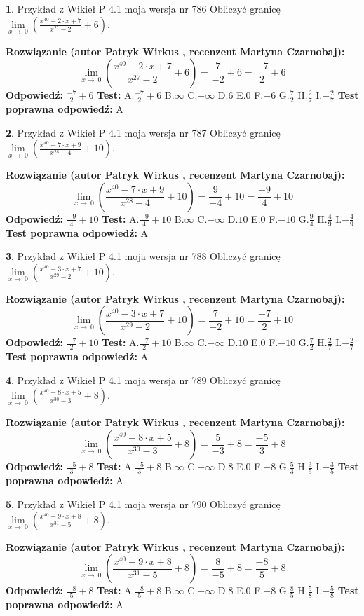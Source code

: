 \documentclass[12pt, a4paper]{article}
\theoremstyle{definition} %
\newtheorem{zad}{}
\newcommand{\zadStart}[1]{\begin{zad}#1\newline}
\newcommand{\zadStop}{\end{zad}}
\newcommand{\rozwStart}[2]{\noindent \textbf{Rozwiązanie (autor #1 , recenzent #2): }\newline}
\newcommand{\rozwStop}{\newline}
\newcommand{\odpStart}{\noindent \textbf{Odpowiedź:}\newline}
\newcommand{\odpStop}{\newline}
\newcommand{\testStart}{\noindent \textbf{Test:}\newline}
\newcommand{\testStop}{\newline}
\newcommand{\kluczStart}{\noindent \textbf{Test poprawna odpowiedź:}\newline}
\newcommand{\kluczStop}{\newline}
\begin{document}
\zadStart{Przykład z Wikieł P 4.1 moja wersja nr 786}
Obliczyć granicę $\lim\limits_{x\to\ 0}(\frac{x^{40}-2 \cdot x +7}{x^{27}-2}+6)$.
\zadStop
\rozwStart{Patryk Wirkus}{Martyna Czarnobaj}
$$\lim\limits_{x\to\ 0}(\frac{x^{40}-2 \cdot x +7}{x^{27}-2}+6)=\frac{7}{-2}+6=\frac{-7}{2}+6$$
\rozwStop
\odpStart
$\frac{-7}{2}+6$
\odpStop
\testStart
A.$\frac{-7}{2}+6$
B.$\infty$
C.$-\infty$
D.$6$
E.$0$
F.$-6$
G.$\frac{7}{2}$
H.$\frac{2}{7}$
I.$-\frac{2}{7}$
\testStop
\kluczStart
A
\kluczStop



\zadStart{Przykład z Wikieł P 4.1 moja wersja nr 787}
Obliczyć granicę $\lim\limits_{x\to\ 0}(\frac{x^{40}-7 \cdot x +9}{x^{28}-4}+10)$.
\zadStop
\rozwStart{Patryk Wirkus}{Martyna Czarnobaj}
$$\lim\limits_{x\to\ 0}(\frac{x^{40}-7 \cdot x +9}{x^{28}-4}+10)=\frac{9}{-4}+10=\frac{-9}{4}+10$$
\rozwStop
\odpStart
$\frac{-9}{4}+10$
\odpStop
\testStart
A.$\frac{-9}{4}+10$
B.$\infty$
C.$-\infty$
D.$10$
E.$0$
F.$-10$
G.$\frac{9}{4}$
H.$\frac{4}{9}$
I.$-\frac{4}{9}$
\testStop
\kluczStart
A
\kluczStop



\zadStart{Przykład z Wikieł P 4.1 moja wersja nr 788}
Obliczyć granicę $\lim\limits_{x\to\ 0}(\frac{x^{40}-3 \cdot x +7}{x^{29}-2}+10)$.
\zadStop
\rozwStart{Patryk Wirkus}{Martyna Czarnobaj}
$$\lim\limits_{x\to\ 0}(\frac{x^{40}-3 \cdot x +7}{x^{29}-2}+10)=\frac{7}{-2}+10=\frac{-7}{2}+10$$
\rozwStop
\odpStart
$\frac{-7}{2}+10$
\odpStop
\testStart
A.$\frac{-7}{2}+10$
B.$\infty$
C.$-\infty$
D.$10$
E.$0$
F.$-10$
G.$\frac{7}{2}$
H.$\frac{2}{7}$
I.$-\frac{2}{7}$
\testStop
\kluczStart
A
\kluczStop



\zadStart{Przykład z Wikieł P 4.1 moja wersja nr 789}
Obliczyć granicę $\lim\limits_{x\to\ 0}(\frac{x^{40}-8 \cdot x +5}{x^{30}-3}+8)$.
\zadStop
\rozwStart{Patryk Wirkus}{Martyna Czarnobaj}
$$\lim\limits_{x\to\ 0}(\frac{x^{40}-8 \cdot x +5}{x^{30}-3}+8)=\frac{5}{-3}+8=\frac{-5}{3}+8$$
\rozwStop
\odpStart
$\frac{-5}{3}+8$
\odpStop
\testStart
A.$\frac{-5}{3}+8$
B.$\infty$
C.$-\infty$
D.$8$
E.$0$
F.$-8$
G.$\frac{5}{3}$
H.$\frac{3}{5}$
I.$-\frac{3}{5}$
\testStop
\kluczStart
A
\kluczStop



\zadStart{Przykład z Wikieł P 4.1 moja wersja nr 790}
Obliczyć granicę $\lim\limits_{x\to\ 0}(\frac{x^{40}-9 \cdot x +8}{x^{31}-5}+8)$.
\zadStop
\rozwStart{Patryk Wirkus}{Martyna Czarnobaj}
$$\lim\limits_{x\to\ 0}(\frac{x^{40}-9 \cdot x +8}{x^{31}-5}+8)=\frac{8}{-5}+8=\frac{-8}{5}+8$$
\rozwStop
\odpStart
$\frac{-8}{5}+8$
\odpStop
\testStart
A.$\frac{-8}{5}+8$
B.$\infty$
C.$-\infty$
D.$8$
E.$0$
F.$-8$
G.$\frac{8}{5}$
H.$\frac{5}{8}$
I.$-\frac{5}{8}$
\testStop
\kluczStart
A
\kluczStop
\end{document}
